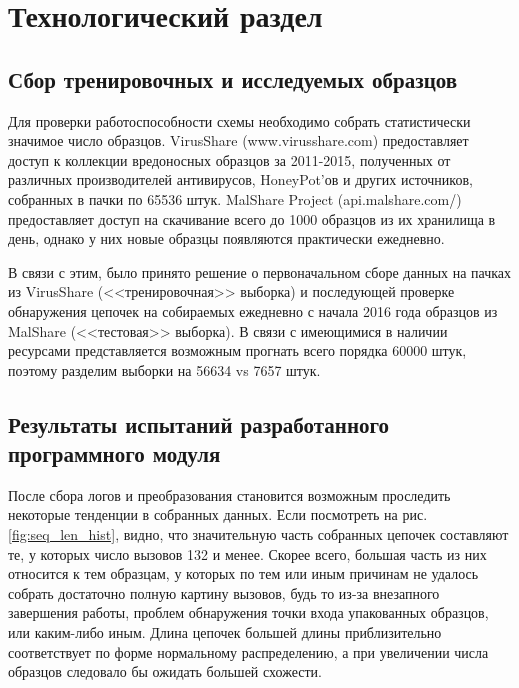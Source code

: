 \section {Технологический раздел}
\subsection {Сбор тренировочных и исследуемых образцов}
Для проверки работоспособности схемы необходимо собрать статистически значимое число образцов. 
VirusShare (www.virusshare.com) предоставляет доступ к коллекции вредоносных образцов за 2011-2015, полученных от различных производителей антивирусов, HoneyPot'ов и других источников, собранных в пачки по 65536 штук.
MalShare Project (api.malshare.com/) предоставляет доступ на скачивание  всего до 1000 образцов из их хранилища в день, однако у них новые образцы появляются практически ежедневно.

В связи с этим, было принято решение о первоначальном сборе данных на пачках из VirusShare (<<тренировочная>> выборка) и последующей проверке обнаружения цепочек на собираемых ежедневно с начала 2016 года образцов из MalShare (<<тестовая>> выборка). В связи с имеющимися в наличии ресурсами представляется возможным прогнать всего порядка 60000 штук, поэтому разделим выборки на 56634 vs 7657 штук.

\subsection {Результаты испытаний разработанного программного модуля}
После сбора логов и преобразования становится возможным проследить некоторые тенденции в собранных данных. Если посмотреть на рис. \ref{fig:seq_len_hist}, видно, что значительную часть собранных цепочек составляют те, у которых число вызовов 132 и менее. Скорее всего, большая часть из них относится к тем образцам, у которых по тем или иным причинам не удалось собрать достаточно полную картину вызовов, будь то из-за внезапного завершения работы, проблем обнаружения точки входа упакованных образцов, или каким-либо иным. Длина цепочек большей длины приблизительно соответствует по форме нормальному распределению, а при увеличении числа образцов следовало бы ожидать большей схожести.


